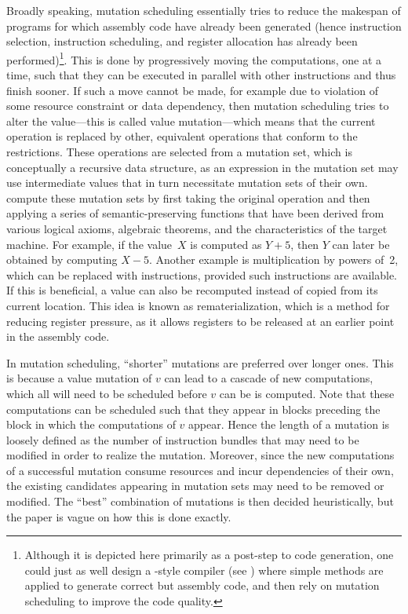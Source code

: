 Broadly speaking, \gls{mutation scheduling} essentially tries to reduce the
makespan of \glspl{program} for which \gls{assembly code} have already been
generated (hence \gls{instruction selection}, \gls{instruction scheduling}, and
\gls{register allocation} has already been performed)\footnote{Although it is
  depicted here primarily as a post-step to \gls{code generation}, one could
  just as well design a -style \gls{compiler}
  (see ) where simple methods are applied to
  generate correct but \naive \gls{assembly code}, and then rely on
  \gls{mutation scheduling} to improve the code quality.}.
%
This is done by
progressively moving the computations, one at a time, such that they can be
executed in parallel with other \glspl{instruction} and thus finish sooner.
%
If
such a move cannot be made, for example due to violation of some resource
constraint or data dependency, then \gls{mutation scheduling} tries to alter the
value---this is called \gls{value mutation}---which means that the current
operation is replaced by other, equivalent operations that conform to the
restrictions.
%
These operations are selected from a \gls{mutation set}, which is
conceptually a recursive data structure, as an expression in the \gls{mutation
  set} may use intermediate values that in turn necessitate \glspl{mutation set}
of their own.
%
\citeauthor{Novack2002} compute these \glspl{mutation set} by
first taking the original operation and then applying a series of
semantic-preserving functions that have been derived from various logical
axioms, algebraic theorems, and the characteristics of the \gls{target
  machine}.
%
For example, if the value~$X$ is computed as \mbox{$Y + 5$}, then
$Y$ can later be obtained by computing \mbox{$X - 5$}.
%
Another example is
multiplication by powers of~2, which can be replaced with 
\glspl{instruction}, provided such \glspl{instruction} are available.
%
If this is
beneficial, a value can also be recomputed instead of copied from its current
location.
%
This idea is known as \gls{rematerialization}, which is a method for
reducing \gls{register pressure}, as it allows \glspl{register} to be released
at an earlier point in the \gls{assembly code}.

In \gls{mutation scheduling}, ``shorter'' mutations are preferred over longer
ones.
%
This is because a \gls{value mutation} of $v$ can lead to a cascade of new
computations, which all will need to be scheduled before $v$ can be is
computed.
%
Note that these computations can be scheduled such that they appear in
\glspl{block} preceding the \gls{block} in which the computations of $v$
appear.
%
Hence the length of a mutation is loosely defined as the number of
\gls{instruction} \glspl{bundle} that may need to be modified in order to
realize the mutation.
%
Moreover, since the new computations of a successful
mutation consume resources and incur dependencies of their own, the existing
candidates appearing in \glspl{mutation set} may need to be removed or
modified.
%
The ``best'' combination of mutations is then decided heuristically,
but the paper is vague on how this is done exactly.

